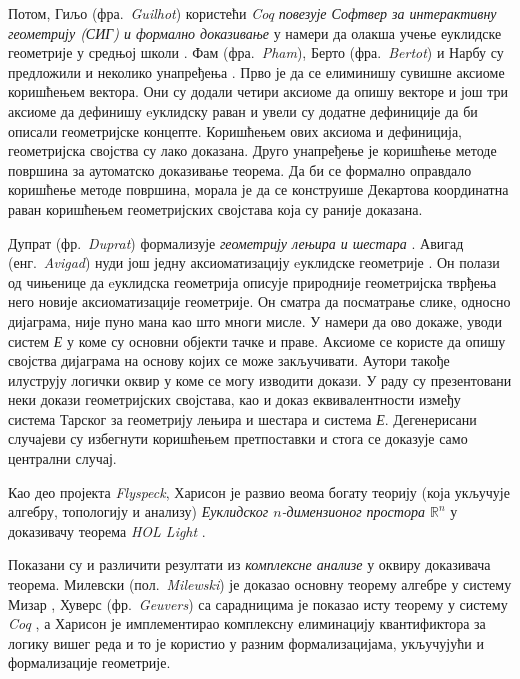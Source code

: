 Потом, Гиљо (фра.~\emph{Guilhot}) користећи \emph{Coq} \emph{повезује
  Софтвер за интерактивну геометрију (СИГ) и формално доказивање} у
намери да олакша учење еуклидске геометрије у средњој школи
\cite{guilhot}. Фам (фра.~\emph{Pham}), Берто (фра.~\emph{Bertot}) и
Нарбу су предложили и неколико унапређења \cite{coqly}. Прво је да се
елиминишу сувишне аксиоме коришћењем вектора. Они су додали четири
аксиоме да опишу векторе и још три аксиоме да дефинишу eуклидску раван
и увели су додатне дефиниције да би описали геометријске
концепте. Коришћењем ових аксиома и дефиниција, геометријска својства
су лако доказана. Друго унапређење је коришћење методе површина за
аутоматско доказивање теорема. Да би се формално оправдало коришћење
методе површина, морала је да се конструише Декартова координатна
раван коришћењем геометријских својстава која су раније доказана.

Дупрат (фр.~\emph{Duprat}) формализује \emph{геометрију лењира и
  шестара} \cite{duprat2008}.  Авигад (енг.~\emph{Avigad}) нуди још
једну аксиоматизацију eуклидске геометрије \cite{avigad}. Он полази од
чињенице да eуклидска геометрија описује природније геометријска
тврђења него новије аксиоматизације геометрије. Он сматра да
посматрање слике, односно дијаграма, није пуно мана као што многи
мисле. У намери да ово докаже, уводи систем \emph{Е} у коме су основни
објекти тачке и праве. Аксиоме се користе да опишу својства дијаграма
на основу којих се може закључивати. Аутори такође илуструју логички
оквир у коме се могу изводити докази. У раду су презентовани неки
докази геометријских својстава, као и доказ еквивалентности између
система Тарског за геометрију лењира и шестара и система
\emph{Е}. Дегенерисани случајеви су избегнути коришћењем претпоставки
и стога се доказује само централни случај.

Као део пројекта \emph{Flyspeck}, Харисон је развио веома богату
теорију (која укључује алгебру, топологију и анализу) \emph{Еуклидског
  $n$-димензионог простора $\mathbb{R}^n$} у доказивачу теорема
\emph{HOL Light} \cite{harrison05,harrison2013hol}.

Показани су и различити резултати из \emph{комплексне анализе} у
оквиру доказивача теорема. Милевски (пол.~\emph{Milewski}) је доказао
основну теорему алгебре у систему Мизар \cite{milewski2001fundamental},
Хуверс (фр.~\emph{Geuvers}) са сарадницима је показао исту теорему у
систему \emph{Coq} \cite{geuvers2000constructive}, а Харисон је
имплементирао комплексну елиминацију квантификтора за логику вишег
реда и то је користио у разним формализацијама, укључујући и
формализације геометрије.


